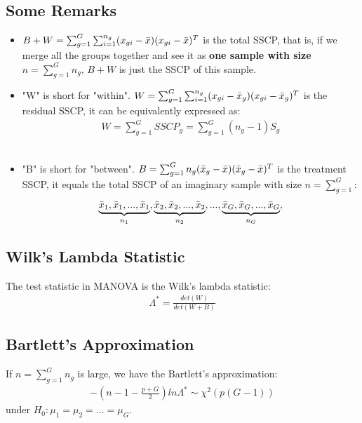 \documentclass[12pt]{extarticle}
\newcommand{\<}{\langle}
\renewcommand{\>}{\rangle}
\theoremstyle{definition}
\begin{document}
\newpage
\subsection{Some Remarks}
\begin{itemize}
    \item $B+W=\sum_{g=1}^G\sum_{i=1}^{n_g}(x_{gi} - \Bar{x})(x_{gi} - \Bar{x})^T$ is the total SSCP, that is, if we merge all the groups together and see it as \textbf{one sample with size} $n=\sum_{g=1}^G n_g$, $B+W$ is just the SSCP of this sample.\\
    
    \item "W" is short for "within". $W=\sum_{g=1}^G \sum_{i=1}^{n_g}(x_{gi} -\Bar{x}_g)(x_{gi} -\Bar{x}_g)^T$ is the residual SSCP, it can be equivalently expressed as:\\
    \begin{eqnarray*}
    W = \sum_{g=1}^G SSCP_g = \sum_{g=1}^G (n_g -1)S_g
    \end{eqnarray*} \\
    
    \item "B" is short for "between". $B=\sum_{g=1}^G n_g (\Bar{x}_g -\Bar{x})(\Bar{x}_g -\Bar{x})^T$ is the treatment SSCP, it equals the total SSCP of an imaginary sample with size $n=\sum_{g=1}^G$:\\
    \begin{eqnarray*}
    \underbrace{\Bar{x}_1,\Bar{x}_1,...,\Bar{x}_1}_{n_1},\underbrace{\Bar{x}_2,\Bar{x}_2,...,\Bar{x}_2}_{n_2},...,\underbrace{\Bar{x}_G,\Bar{x}_G,...,\Bar{x}_G}_{n_G},
    \end{eqnarray*}
\end{itemize}

\subsection{Wilk's Lambda Statistic}
The test statistic in MANOVA is the Wilk's lambda statistic: \\
\begin{eqnarray*}
\Lambda^* = \frac{det(W)}{det(W+B)}
\end{eqnarray*}

\subsection{Bartlett's Approximation}
If $n=\sum_{g=1}^G n_g$ is large, we have the Bartlett's approximation: \\
\begin{eqnarray*}
-\left( n-1-\frac{p+G}{2} \right)ln \Lambda^* \sim \chi^2 (p(G-1))
\end{eqnarray*}
under $H_0: \mu_1 = \mu_2 = ... = \mu_G$.
\end{document}
